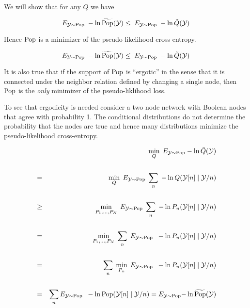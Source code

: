 {

We will show that for any $Q$ we have

\vfill
$$E_{{\cal Y} \sim \mathrm{Pop}}\;-\ln \widetilde{\mathrm{Pop}}({\cal Y}) \leq \;E_{{\cal Y} \sim \mathrm{Pop}}\;-\ln \tilde{Q}({\cal Y})$$

\vfill
Hence $\mathrm{Pop}$ is a minimizer of the pseudo-likelihood cross-entropy.


\vfill
$$E_{{\cal Y} \sim \mathrm{Pop}}\;-\ln \widetilde{\mathrm{Pop}}({\cal Y}) \leq \;E_{{\cal Y} \sim \mathrm{Pop}}\;-\ln \tilde{Q}({\cal Y})$$

\vfill
It is also true that if the support of $\mathrm{Pop}$ is ``ergotic'' in the sense that it is connected under the neighbor relation defined by changing a single node, then
$\mathrm{Pop}$ is the {\em only} minimizer of the pseudo-liklihood loss.

\vfill
To see that ergodicity is needed consider a two node network with Boolean nodes that agree with probability 1.  The conditional distributions do not determine
the probability that the nodes are true and hence many distributions minimize the pseudo-likelihood cross-entropy.


{\huge
\begin{eqnarray*}
  & & \min_Q \;E_{{\cal Y}\sim \mathrm{Pop}} -\ln \tilde{Q}({\cal Y}) \\
  \\
  & = & \min_Q \;E_{{\cal Y}\sim \mathrm{Pop}} \;\sum_n\;-\ln Q({\cal Y}[n]\;|\;{\cal Y}/n) \\
  \\
  & \geq & \min_{P_1,\ldots,P_N} \;E_{{\cal Y}\sim \mathrm{Pop}} \;\sum_n\;-\ln P_n({\cal Y}[n]\;|\;{\cal Y}/n) \\
  \\
  & = & \min_{P_1,\ldots,P_N} \;\sum_n \;E_{{\cal Y} \sim \mathrm{Pop}}\;\; -\ln P_n({\cal Y}[n]\;|\;{\cal Y}/n) \\
  \\          
  & = & \sum_n \;\min_{P_n}\;E_{{\cal Y} \sim \mathrm{Pop}}\;\; -\ln P_n({\cal Y}[n]\;|\;{\cal Y}/n) \\
  \\
    & = & \sum_n E_{{\cal Y} \sim \mathrm{Pop}}\;\; -\ln \mathrm{Pop}({\cal Y}[n]\;|\;{\cal Y}/n) =  E_{{\cal Y} \sim \mathrm{Pop}}{-\ln \widetilde{\mathrm{Pop}}({\cal Y})}
\end{eqnarray*}
}


}
